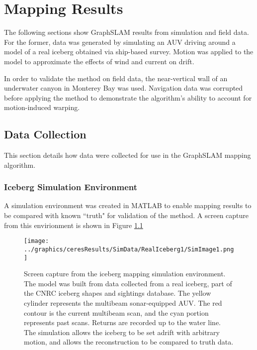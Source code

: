 
\chapter{Mapping Results}
\label{ch.Results}

The following sections show GraphSLAM results from simulation and field data. For the former, data was generated by simulating an AUV driving around a model of a real iceberg obtained via ship-based survey. Motion was applied to the model to approximate the effects of wind and current on drift.

In order to validate the method on field data, the near-vertical wall of an underwater canyon in Monterey Bay was used. Navigation data was corrupted before applying the method to demonstrate the algorithm's ability to account for motion-induced warping.

\section{Data Collection}

This section details how data were collected for use in the GraphSLAM mapping algorithm.

\subsection{Iceberg Simulation Environment}

A simulation environment was created in MATLAB to enable mapping results to be compared with known ``truth" for validation of the method. A screen capture from this envirionment is shown in Figure \ref{fig:IcebergSim}
 
 \begin{figure}[!htb]
   \centering
   \texttt{[image: ../graphics/ceresResults/SimData/RealIceberg1/SimImage1.png]} %
   \caption{Screen capture from the iceberg mapping simulation environment. The model was built from data collected from a real iceberg, part of the CNRC iceberg shapes and sightings database. The yellow cylinder represents the multibeam sonar-equipped AUV. The red contour is the current multibeam scan, and the cyan portion represents past scans. Returns are recorded up to the water line. The simulation allows the iceberg to be set adrift with arbitrary motion, and allows the reconstruction to be compared to truth data.}
   \label{fig:IcebergSim}
\end{figure}

